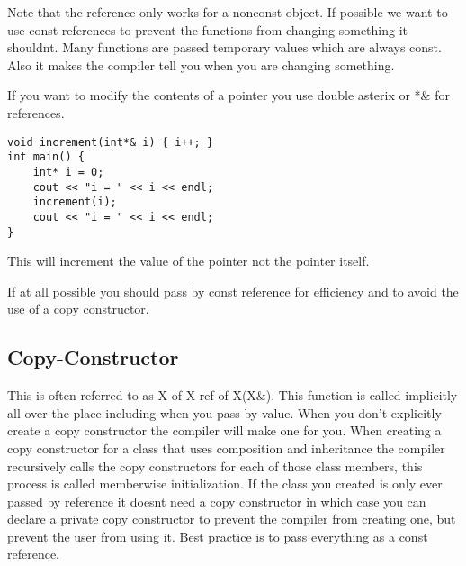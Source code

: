 \documentclass[12pt]{article}
\begin{document}
Note that the reference only works for a nonconst object. If possible we want to use const references to prevent the functions from changing something it shouldnt. Many functions are passed temporary values which are always const. Also it makes the compiler tell you when you are changing something.

If you want to modify the contents of a pointer you use double asterix or *\& for references.
\begin{lstlisting}
void increment(int*& i) { i++; }
int main() {
    int* i = 0;
    cout << "i = " << i << endl;
    increment(i);
    cout << "i = " << i << endl;
}
\end{lstlisting}
This will increment the value of the pointer not the pointer itself.

If at all possible you should pass by const reference for efficiency and to avoid the use of a copy constructor.


\subsection*{Copy-Constructor}
This is often referred to as X of X ref of X(X\&). This function is called implicitly all over the place including when you pass by value. When you don't explicitly create a copy constructor the compiler will make one for you. When creating a copy constructor for a class that uses composition and inheritance the compiler recursively calls the copy constructors for each of those class members, this process is called memberwise initialization. If the class you created is only ever passed by reference it doesnt need a copy constructor in which case you can declare a private copy constructor to prevent the compiler from creating one, but prevent the user from using it. Best practice is to pass everything as a const reference.
\end{document}

